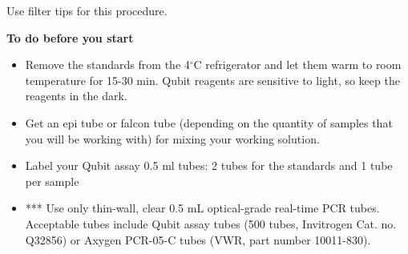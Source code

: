 \documentclass[11pt, oneside]{article}
\begin{document}
		\noindent Use filter tips for this procedure.
	
		\vspace{5mm}
	
		{\bf To do before you start}	
	
		\begin{itemize}
			\item Remove the standards from the 4$^{\circ}$C refrigerator and let them warm to room temperature for 15-30 min. Qubit reagents are 				sensitive to light, so keep the reagents in the dark. 
			\item Get an epi tube or falcon tube (depending on the quantity of samples that you will be working with) for mixing your working solution.
			\item Label your Qubit assay 0.5 ml tubes: 2 tubes for the standards and 1 tube per sample
			\item *** Use only thin-wall, clear 0.5 mL optical-grade real-time PCR tubes. Acceptable tubes include Qubit assay tubes (500 tubes, 				Invitrogen 	Cat. no. Q32856) or Axygen PCR-05-C tubes (VWR, part number 10011-830).
		\end{itemize}
		
		\vspace{5mm}
		
\end{document}
